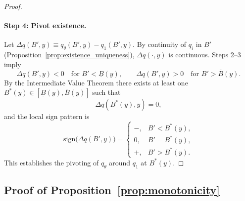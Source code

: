 \documentclass[12pt]{article}
\theoremstyle{plain}
\begin{document}
\begin{proof}
	\paragraph{Step 4: Pivot existence.}
	Let $\Delta q(B',y)\equiv q_\theta(B',y)-q_1(B',y)$. By continuity of $q_i$ in
	$B'$ (Proposition~\ref{prop:existence_uniqueness}), $\Delta q(\cdot,y)$ is
	continuous. Steps 2–3 imply
	\[
		\Delta q(B',y)<0\quad \text{for } B'<\underline{B}(y),
		\qquad
		\Delta q(B',y)>0\quad \text{for } B'>\overline{B}(y).
	\]
	By the Intermediate Value Theorem there exists at least one
	$B^*(y)\in[\underline{B}(y),\overline{B}(y)]$ such that
	\[
		\Delta q(B^*(y),y)=0,
	\]
	and the local sign pattern is
	\[
		\mathrm{sign}\bigl(\Delta q(B',y)\bigr)
		=
		\begin{cases}
			-\!, & B'<B^*(y), \\
			0,   & B'=B^*(y), \\
			+\!, & B'>B^*(y).
		\end{cases}
	\]
	This establishes the pivoting of $q_\theta$ around $q_1$ at $B^*(y)$.
\end{proof}

\subsection{Proof of Proposition~\ref{prop:monotonicity}}\label{app:proof_monotonicity}
\end{document}
